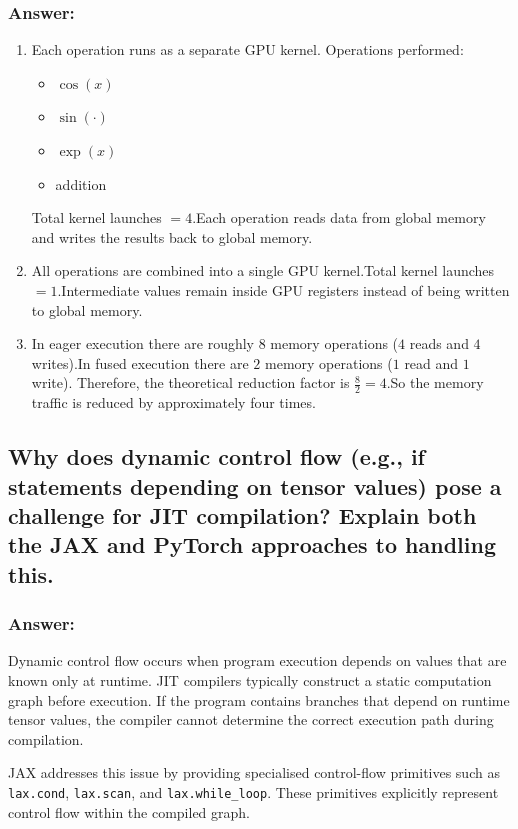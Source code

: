 \documentclass{article}
\begin{document}
\subsubsection*{Answer:}
\begin{enumerate}
    \item [(a)]
    Each operation runs as a separate GPU kernel.
    Operations performed:
    \begin{itemize}
    \item $\cos(x)$
    \item $\sin(\cdot)$
    \item $\exp(x)$
    \item addition
    \end{itemize}
    Total kernel launches $= 4$.Each operation reads data from global memory and writes the results back to global memory.

\item[(b)]
All operations are combined into a single GPU kernel.Total kernel launches $= 1$.Intermediate values remain inside GPU registers instead of being written to global memory.

\item[(c)]
In eager execution there are roughly $8$ memory operations ($4$ reads and $4$ writes).In fused execution there are $2$ memory operations ($1$ read and $1$ write).
Therefore, the theoretical reduction factor is $\frac{8}{2} = 4$.So the memory traffic is reduced by approximately four times.
\end{enumerate}

\subsection{Why does dynamic control flow (e.g., if statements depending
on tensor values) pose a challenge for JIT compilation? Explain both the
JAX and PyTorch approaches to handling this.}


\subsubsection*{Answer:}

Dynamic control flow occurs when program execution depends on values that are known only at runtime. JIT compilers typically construct a static computation graph before execution. If the program contains branches that depend on runtime tensor values, the compiler cannot determine the correct execution path during compilation.

JAX addresses this issue by providing specialised control-flow primitives such as \texttt{lax.cond}, \texttt{lax.scan}, and \texttt{lax.while\_loop}. These primitives explicitly represent control flow within the compiled graph.
\end{document}
